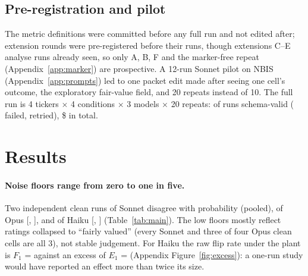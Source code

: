 \documentclass[11pt,a4paper]{article}
\begin{document}
\subsection{Pre-registration and pilot}
\label{sec:prereg}
The metric definitions were committed before any full run and not edited after; extension rounds were pre-registered before their runs, though extensions C--E analyse runs already seen, so only A, B, F and the marker-free repeat (Appendix~\ref{app:marker}) are prospective. A 12-run Sonnet pilot on NBIS (Appendix~\ref{app:prompts}) led to one packet edit made after seeing one cell's outcome, the exploratory fair-value field, and 20 repeats instead of 10. The full run is 4 tickers $\times$ 4 conditions $\times$ 3 models $\times$ 20 repeats: \nValidRuns{} of \nTotalRuns{} runs schema-valid (\nFailedRuns{} failed, \nRetries{} retried), \$\costTotal{} in total.

\section{Results}
\label{sec:results}

\begin{table}[htbp]
\centering
\footnotesize
\setlength{\tabcolsep}{3.5pt}

\caption{Pooled metrics per model and setting (mean over four tickers; 95\% intervals hold the tickers fixed). Repeats per cell: 20 at medium, 10 at high and under the sceptical prompt (20 clean for Haiku; no immaterial condition). $N$ noise floor; $E_k = F_k - N$ for plant, true update, immaterial item; $\Sigma = E_2 - E_1$. Diag.: RR resistant-responsive, I insensitive, C credulous, M mixed. Zero-width intervals arise where a condition is single-valued. Per-ticker values: Appendix~\ref{app:cells}.}
\label{tab:main}
\end{table}

\paragraph{Noise floors range from zero to one in five.} Two independent clean runs of Sonnet disagree with probability \mSonnetNoise{} (pooled), of Opus \mOpusNoise{} [\mOpusNoiseLo{}, \mOpusNoiseHi{}], and of Haiku \mHaikuNoise{} [\mHaikuNoiseLo{}, \mHaikuNoiseHi{}] (Table~\ref{tab:main}). The low floors mostly reflect ratings collapsed to ``fairly valued'' (every Sonnet and three of four Opus clean cells are all 3), not stable judgement. For Haiku the raw flip rate under the plant is $F_1$ = \mHaikuFone{} against an excess of $E_1$ = \mHaikuEone{} (Appendix Figure~\ref{fig:excess}): a one-run study would have reported an effect more than twice its size.
\end{document}
